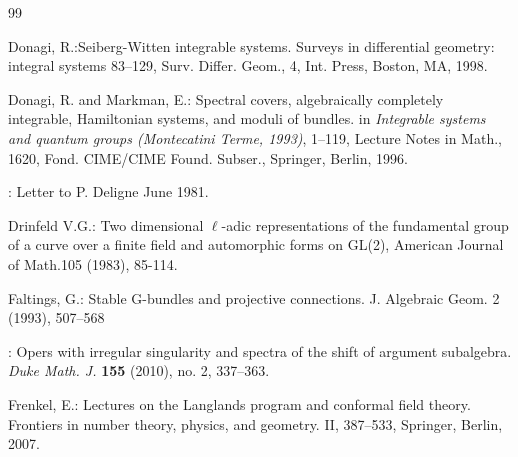 \begin{thebibliography}{99}
	
	
	 Donagi, R.:Seiberg-Witten integrable systems. Surveys in differential geometry: integral systems  83--129,
Surv. Differ. Geom., 4, Int. Press, Boston, MA, 1998.
	
	 Donagi, R. {\rm and} Markman, E.: Spectral covers, algebraically completely integrable, Hamiltonian systems, and moduli of bundles. {in \em Integrable systems and quantum groups (Montecatini Terme, 1993)}, 1–119,
Lecture Notes in Math., 1620, Fond. CIME/CIME Found. Subser., Springer, Berlin, 1996.
	
	
	: Letter to P. Deligne June 1981.
	
	 Drinfeld V.G.: Two dimensional $\ell$-adic representations of the fundamental group of a curve over a finite field and automorphic forms on GL(2), American Journal of Math.105 (1983), 85-114.
	
		

	
		 { Faltings, G.}: Stable G-bundles and projective connections. J. Algebraic Geom. 2 (1993), 507--568 

	
	:
	Opers with irregular singularity and spectra of the shift of argument subalgebra. 
	{\em Duke Math. J. }{\bf 155} (2010), no. 2, 337--363.
	
 Frenkel, E.:
Lectures on the Langlands program and conformal field theory. Frontiers in number theory, physics, and geometry. II, 387--533, Springer, Berlin, 2007.
	

\end{thebibliography}
